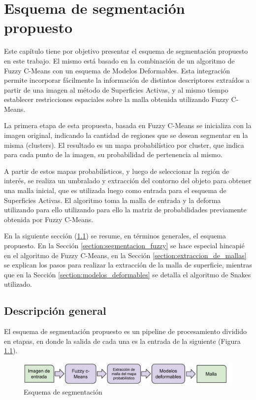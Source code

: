 \chapter{Esquema de segmentación propuesto}\label{chapter:metodos}
Este capítulo tiene por objetivo presentar el esquema de segmentación propuesto en este trabajo.  El mismo está basado en la combinación de un algoritmo de Fuzzy C-Means con un esquema de Modelos Deformables. Esta integración permite incorporar fácilmente la información de distintos descriptores extraídos a partir de una imagen al método de Superficies Activas, y al mismo tiempo establecer restricciones espaciales sobre la malla obtenida utilizando Fuzzy C-Means.
 
La primera etapa de esta propuesta, basada en Fuzzy C-Means se inicializa con la imagen original, indicando la cantidad de regiones que se desean segmentar en la misma (clusters). El resultado es un mapa probabilístico por cluster, que indica para cada punto de la imagen, su probabilidad de pertenencia al mismo.

A partir de estos mapas probabilísticos, y luego de seleccionar la región de interés, se realiza un umbralado y extracción del contorno del objeto para obtener una malla inicial, que es utilizada luego como entrada para el esquema de Superficies Activas. El algoritmo toma la malla de entrada y la deforma utilizando para ello utilizando para ello la matriz de probabilidades previamente obtenida por Fuzzy C-Means.

En la siguiente sección (\ref{section:descripcion_general}) se resume, en términos generales, el esquema propuesto. En la Sección \ref{section:segmentacion_fuzzy} se hace especial hincapié en el algoritmo de Fuzzy C-Means, en la Sección \ref{section:extraccion_de_mallas} se explican los pasos para realizar la extracción de la malla de superficie, mientras que en la Sección \ref{section:modelos_deformables} se detalla el algoritmo de Snakes utilizado.

\section{Descripción general}\label{section:descripcion_general}
El esquema de segmentación propuesto es un pipeline de procesamiento dividido en etapas, en donde la salida de cada una es la entrada de la siguiente (Figura \ref{fig:esquema_de_segmentacion}).


\begin{figure}[H]
	\centering
	\includegraphics[scale=0.4]{images/pipeline_de_segmentacion.jpg}
	\caption{Esquema de segmentación}
	\label{fig:esquema_de_segmentacion}
\end{figure}

